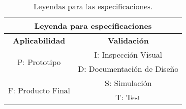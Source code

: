 \begin{table}[H]
\centering
\begin{tabular}{|c|c|}
\hline
\multicolumn{2}{|c|}{\textbf{Leyenda para especificaciones}}    \\ \hline
\textbf{Aplicabilidad}             & \textbf{Validación}        \\ \hline
\multirow{2}{*}{P: Prototipo}      & I: Inspección Visual       \\ \cline{2-2} 
                                   & D: Documentación de Diseño \\ \hline
\multirow{2}{*}{F: Producto Final} & S: Simulación              \\ \cline{2-2} 
                                   & T: Test                    \\ \hline
\end{tabular}
\caption{Leyendas para las especificaciones.}
\end{table}


